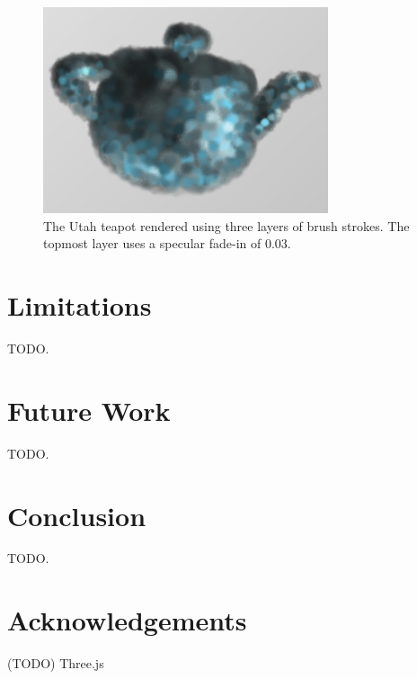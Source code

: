 \documentclass[conference]{acmsiggraph}
\begin{document}
\begin{figure}[ht]
  \centering
  \includegraphics[width=3.3in]{images/teapot_with_background}
  \caption{The Utah teapot rendered using three layers of brush strokes.
           The topmost layer uses a specular fade-in of 0.03.}
\end{figure}

\section{Limitations}

TODO.

\section{Future Work}

TODO.

\section{Conclusion}

TODO.

\section*{Acknowledgements}

(TODO) Three.js



\end{document}
